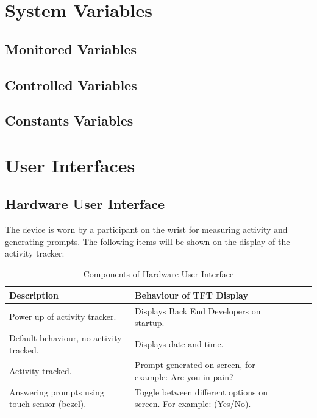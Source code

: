 \documentclass[12pt, titlepage]{article}
\begin{document}
\section{System Variables}


\subsection{Monitored Variables}

\subsection{Controlled Variables}

\subsection{Constants Variables}

\section{User Interfaces}

\subsection{Hardware User Interface}

The device is worn by a participant on the wrist for measuring activity and generating  prompts. The following items will be shown on the display of the activity tracker:
\begin{table}[H]
	\begin{tabularx}{1.05\textwidth} { 
		  | >{\centering\arraybackslash}X 
		  | >{\centering\arraybackslash}X 
		  | >{\centering\arraybackslash}X 
		  | >{\centering\arraybackslash}X | }
		 \hline
		 \textbf{Description} & \textbf{Behaviour of TFT Display} \\
		 \hline
		Power up of activity tracker. & Displays Back End Developers on startup.\\
		\hline
		 Default behaviour, no activity tracked.  & Displays date and time.\\
		 \hline
		   Activity tracked. & Prompt generated on screen, for example: Are you in pain?\\
		\hline 
		Answering prompts using touch sensor (bezel). & Toggle between different 				options on screen. For example: (Yes/No).\\
		\hline
	\end{tabularx}
\caption{\label{Hardware User Interface}Components of Hardware User Interface}  
\end{table}
\end{document}
